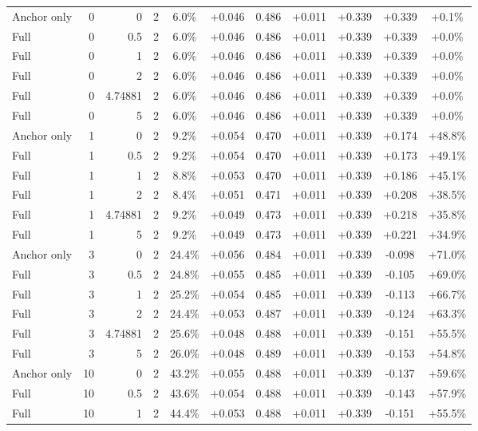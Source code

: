\begin{table}[htbp]
\begin{tabular}{lrrrccccccc}
Anchor only & 0 & 0 & 2 & 6.0\% & +0.046 & 0.486 & +0.011 & +0.339 & +0.339 & +0.1\% \\
Full & 0 & 0.5 & 2 & 6.0\% & +0.046 & 0.486 & +0.011 & +0.339 & +0.339 & +0.0\% \\
Full & 0 & 1 & 2 & 6.0\% & +0.046 & 0.486 & +0.011 & +0.339 & +0.339 & +0.0\% \\
Full & 0 & 2 & 2 & 6.0\% & +0.046 & 0.486 & +0.011 & +0.339 & +0.339 & +0.0\% \\
Full & 0 & 4.74881 & 2 & 6.0\% & +0.046 & 0.486 & +0.011 & +0.339 & +0.339 & +0.0\% \\
Full & 0 & 5 & 2 & 6.0\% & +0.046 & 0.486 & +0.011 & +0.339 & +0.339 & +0.0\% \\
Anchor only & 1 & 0 & 2 & 9.2\% & +0.054 & 0.470 & +0.011 & +0.339 & +0.174 & +48.8\% \\
Full & 1 & 0.5 & 2 & 9.2\% & +0.054 & 0.470 & +0.011 & +0.339 & +0.173 & +49.1\% \\
Full & 1 & 1 & 2 & 8.8\% & +0.053 & 0.470 & +0.011 & +0.339 & +0.186 & +45.1\% \\
Full & 1 & 2 & 2 & 8.4\% & +0.051 & 0.471 & +0.011 & +0.339 & +0.208 & +38.5\% \\
Full & 1 & 4.74881 & 2 & 9.2\% & +0.049 & 0.473 & +0.011 & +0.339 & +0.218 & +35.8\% \\
Full & 1 & 5 & 2 & 9.2\% & +0.049 & 0.473 & +0.011 & +0.339 & +0.221 & +34.9\% \\
Anchor only & 3 & 0 & 2 & 24.4\% & +0.056 & 0.484 & +0.011 & +0.339 & -0.098 & +71.0\% \\
Full & 3 & 0.5 & 2 & 24.8\% & +0.055 & 0.485 & +0.011 & +0.339 & -0.105 & +69.0\% \\
Full & 3 & 1 & 2 & 25.2\% & +0.054 & 0.485 & +0.011 & +0.339 & -0.113 & +66.7\% \\
Full & 3 & 2 & 2 & 24.4\% & +0.053 & 0.487 & +0.011 & +0.339 & -0.124 & +63.3\% \\
Full & 3 & 4.74881 & 2 & 25.6\% & +0.048 & 0.488 & +0.011 & +0.339 & -0.151 & +55.5\% \\
Full & 3 & 5 & 2 & 26.0\% & +0.048 & 0.489 & +0.011 & +0.339 & -0.153 & +54.8\% \\
Anchor only & 10 & 0 & 2 & 43.2\% & +0.055 & 0.488 & +0.011 & +0.339 & -0.137 & +59.6\% \\
Full & 10 & 0.5 & 2 & 43.6\% & +0.054 & 0.488 & +0.011 & +0.339 & -0.143 & +57.9\% \\
Full & 10 & 1 & 2 & 44.4\% & +0.053 & 0.488 & +0.011 & +0.339 & -0.151 & +55.5\% \\

\end{tabular}
\end{table}
